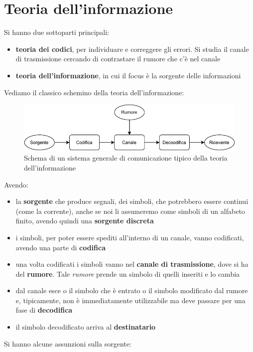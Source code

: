 \documentclass[a4paper,12pt, oneside]{book}
\begin{document}
\chapter{Teoria dell'informazione}
Si hanno due sottoparti principali:
\begin{itemize}
  \item \textbf{teoria dei codici}, per individuare e correggere gli errori. Si
  studia il canale di trasmissione cercando di contrastare il rumore che c'è nel
  canale
  \item \textbf{teoria dell'informazione}, in cui il focus è la sorgente delle
  informazioni
\end{itemize}
Vediamo il classico schemino della teoria dell'informazione:
\begin{figure}[H]
  \centering
  \includegraphics[width = \textwidth]{img/teo.pdf}
  \caption{Schema di un sistema generale di comunicazione tipico della teoria
    dell'informazione} 
  \label{fig:teo}
\end{figure}
Avendo:
\begin{itemize}
  \item la \textbf{sorgente} che produce segnali, dei simboli, che potrebbero
  essere continui (come la corrente), anche se noi li assumeremo come simboli di
  un alfabeto finito, avendo quindi una \textbf{sorgente discreta}
  \item i simboli, per poter essere spediti all'interno di un canale, vanno
  codificati, avendo una parte di \textbf{codifica}
  \item una volta codificati i simboli vanno nel \textbf{canale di
    trasmissione}, dove si ha del \textbf{rumore}. Tale \textit{rumore} prende
  un simbolo di quelli inseriti e lo cambia
  \item dal canale esce o il simbolo che è entrato o il simbolo modificato dal
  rumore e, tipicamente, non è immediatamente utilizzabile ma deve passare per
  una fase di \textbf{decodifica}
  \item il simbolo decodificato arriva al \textbf{destinatario}
\end{itemize}
Si hanno
alcune assunzioni sulla sorgente:
\end{document}
